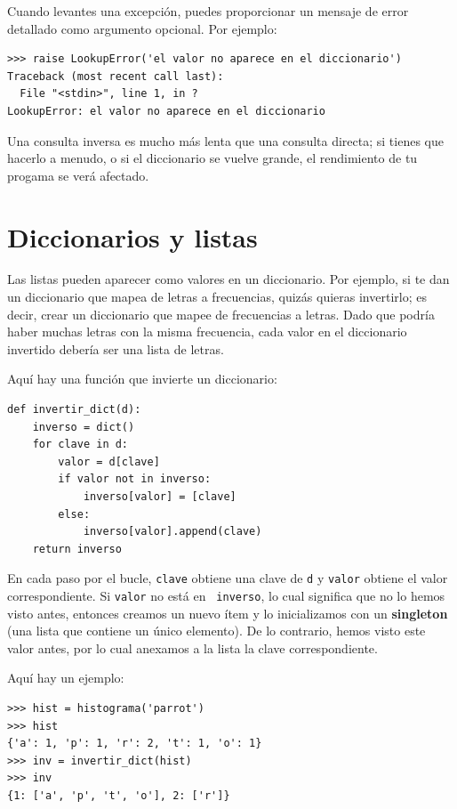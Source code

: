\documentclass[10pt]{book}
\begin{document}
Cuando levantes una excepción, puedes proporcionar un mensaje de error detallado como argumento opcional.  Por ejemplo:

\begin{verbatim}
>>> raise LookupError('el valor no aparece en el diccionario')
Traceback (most recent call last):
  File "<stdin>", line 1, in ?
LookupError: el valor no aparece en el diccionario
\end{verbatim}
%
Una consulta inversa es mucho más lenta que una consulta directa; si
tienes que hacerlo a menudo, o si el diccionario se vuelve grande, el rendimiento
de tu progama se verá afectado.


\section{Diccionarios y listas}
\label{invert}

Las listas pueden aparecer como valores en un diccionario.  Por ejemplo, si
te dan un diccionario que mapea de letras a frecuencias,
quizás quieras invertirlo; es decir, crear un diccionario que mapee
de frecuencias a letras.  Dado que podría haber muchas letras
con la misma frecuencia, cada valor en el diccionario invertido
debería ser una lista de letras.

Aquí hay una función que invierte un diccionario:

\begin{verbatim}
def invertir_dict(d):
    inverso = dict()
    for clave in d:
        valor = d[clave]
        if valor not in inverso:
            inverso[valor] = [clave]
        else:
            inverso[valor].append(clave)
    return inverso
\end{verbatim}
%
En cada paso por el bucle, {\tt clave} obtiene una clave de {\tt d} y
{\tt valor} obtiene el valor correspondiente.  Si {\tt valor} no está en {\tt
  inverso}, lo cual significa que no lo hemos visto antes, entonces creamos un nuevo
ítem y lo inicializamos con un {\bf singleton} (una lista que contiene un
único elemento).  De lo contrario, hemos visto este valor antes, por lo cual
anexamos a la lista la clave correspondiente.  

Aquí hay un ejemplo:

\begin{verbatim}
>>> hist = histograma('parrot')
>>> hist
{'a': 1, 'p': 1, 'r': 2, 't': 1, 'o': 1}
>>> inv = invertir_dict(hist)
>>> inv
{1: ['a', 'p', 't', 'o'], 2: ['r']}
\end{verbatim}
\end{document}
